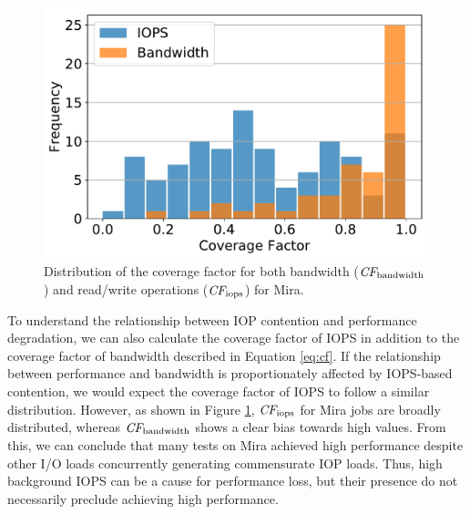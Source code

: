 \begin{figure}[t]
    \centering
    \includegraphics[width=\columnwidth]{figs/hist-cf-bw-and-ops.pdf}
    \caption{Distribution  of the coverage factor for both bandwidth ($\textit{CF}_{\textup{bandwidth}}$) and read/write operations ($\textit{CF}_{\textup{iops}}$) for Mira.
    }
    \label{fig:hist-cf-mira}
\end{figure}

To understand the relationship between IOP contention and performance degradation, we can also calculate the coverage factor of IOPS in addition to the coverage factor of bandwidth described in Equation \ref{eq:cf}.
If the relationship between performance and bandwidth is proportionately affected by IOPS-based contention, we would expect the coverage factor of IOPS to follow a similar distribution.
However, as shown in Figure \ref{fig:hist-cf-mira}, $\textit{CF}_{\textup{iops}}$ for Mira jobs are broadly distributed, whereas $\textit{CF}_{\textup{bandwidth}}$ shows a clear bias towards high values.
From this, we can conclude that many tests on Mira achieved high performance despite other I/O loads concurrently generating commensurate IOP loads.
Thus, high background IOPS can be a cause for performance loss, but their presence do not necessarily preclude achieving high performance.


